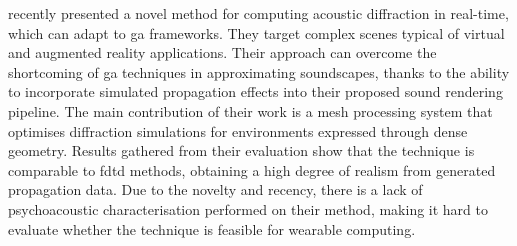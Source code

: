 \cite{schissler2021fast} recently presented a novel method for computing acoustic diffraction in real-time, which can adapt to \acrshort{ga} frameworks. They target complex scenes typical of virtual and augmented reality applications. Their approach can overcome the shortcoming of \acrshort{ga} techniques in approximating soundscapes, thanks to the ability to incorporate simulated propagation effects into their proposed sound rendering pipeline. The main contribution of their work is a mesh processing system that optimises diffraction simulations for environments expressed through dense geometry. Results gathered from their evaluation show that the technique is comparable to \acrshort{fdtd} methods, obtaining a high degree of realism from generated propagation data. Due to the novelty and recency, there is a lack of psychoacoustic characterisation performed on their method, making it hard to evaluate whether the technique is feasible for wearable computing. \par

